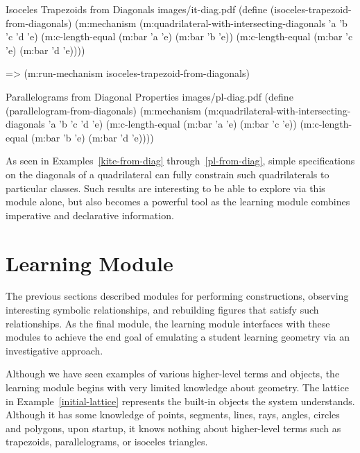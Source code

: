 \begin{pdf-example}
[label=it-from-diag,
comment style={frame hidden,
opacityback=0,
height=5.6cm,
raster columns=2,graphics pages={1,2}}]
{Isoceles Trapezoids from Diagonals}
{images/it-diag.pdf}
(define (isoceles-trapezoid-from-diagonals)
  (m:mechanism
   (m:quadrilateral-with-intersecting-diagonals 'a 'b 'c 'd 'e)
   (m:c-length-equal (m:bar 'a 'e) (m:bar 'b 'e))
   (m:c-length-equal (m:bar 'c 'e) (m:bar 'd 'e))))

=> (m:run-mechanism isoceles-trapezoid-from-diagonals)
\end{pdf-example}

\begin{pdf-example}
[label=pl-from-diag,
comment style={frame hidden,
opacityback=0,
height=5.6cm,
raster columns=2,graphics pages={1,2}}]
{Parallelograms from Diagonal Properties}
{images/pl-diag.pdf}
(define (parallelogram-from-diagonals)
  (m:mechanism
   (m:quadrilateral-with-intersecting-diagonals 'a 'b 'c 'd 'e)
   (m:c-length-equal (m:bar 'a 'e) (m:bar 'c 'e))
   (m:c-length-equal (m:bar 'b 'e) (m:bar 'd 'e))))
\end{pdf-example}

As seen in Examples~\ref{kite-from-diag} through~\ref{pl-from-diag},
simple specifications on the diagonals of a quadrilateral can fully
constrain such quadrilaterals to particular classes.  Such results
are interesting to be able to explore via this module alone, but also
becomes a powerful tool as the learning module combines imperative and
declarative information.

\enlargethispage*{\baselineskip}

\section{Learning Module}
\label{sec:end-goal-1}

The previous sections described modules for performing constructions,
observing interesting symbolic relationships, and rebuilding figures
that satisfy such relationships. As the final module, the learning
module interfaces with these modules to achieve the end goal of
emulating a student learning geometry via an investigative approach.

Although we have seen examples of various higher-level terms and
objects, the learning module begins with very limited knowledge about
geometry. The lattice in Example~\ref{initial-lattice} represents the
built-in objects the system understands. Although it has some
knowledge of points, segments, lines, rays, angles, circles and
polygons, upon startup, it knows nothing about higher-level terms such
as trapezoids, parallelograms, or isoceles triangles.

